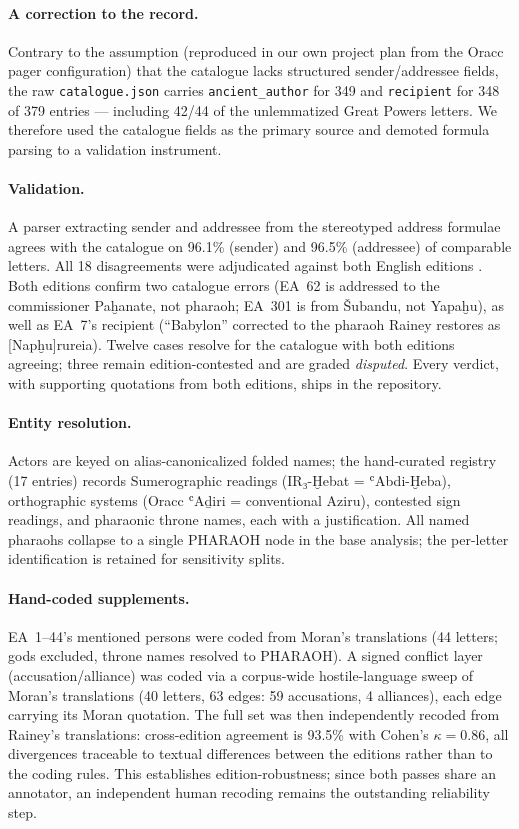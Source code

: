 \documentclass[11pt]{article}
\newcommand{\project}[1]{\texttt{#1}}
\begin{document}
\paragraph{A correction to the record.} Contrary to the assumption
(reproduced in our own project plan from the Oracc pager configuration)
that the catalogue lacks structured sender/addressee fields, the raw
\project{catalogue.json} carries \project{ancient\_author} for 349 and
\project{recipient} for 348 of 379 entries --- including 42/44 of the
unlemmatized Great Powers letters. We therefore used the catalogue fields
as the primary source and demoted formula parsing to a validation
instrument.

\paragraph{Validation.} A parser extracting sender and addressee from
the stereotyped address formulae \citep[cf.][]{Mynarova2007} agrees with
the catalogue on 96.1\% (sender) and 96.5\% (addressee) of comparable
letters. All 18 disagreements were adjudicated against both English
editions \citep{Moran1992, Rainey2015}. Both editions confirm two
catalogue errors (EA~62 is addressed to the commissioner Paḫanate, not
pharaoh; EA~301 is from Šubandu, not Yapaḫu), as well as EA~7's recipient
(``Babylon'' corrected to the pharaoh Rainey restores as
[Napḫu]rureia). Twelve cases resolve for the catalogue with both editions
agreeing; three remain edition-contested and are graded \emph{disputed}.
Every verdict, with supporting quotations from both editions, ships in
the repository.

\paragraph{Entity resolution.} Actors are keyed on alias-canonicalized
folded names; the hand-curated registry (17 entries) records
Sumerographic readings (IR₃-Ḫebat = ʿAbdi-Ḫeba), orthographic systems
(Oracc ʿAḏiri = conventional Aziru), contested sign readings, and
pharaonic throne names, each with a justification.
All named pharaohs collapse to a single PHARAOH node in the base
analysis; the per-letter identification is retained for sensitivity
splits.

\paragraph{Hand-coded supplements.} EA~1--44's mentioned persons were
coded from Moran's translations (44 letters; gods excluded, throne names
resolved to PHARAOH). A signed conflict layer (accusation/alliance) was
coded via a corpus-wide hostile-language sweep of Moran's translations
(40 letters, 63 edges: 59 accusations, 4 alliances), each edge carrying
its Moran quotation. The full set was then independently recoded from
Rainey's translations: cross-edition agreement is 93.5\% with Cohen's
$\kappa=0.86$, all divergences traceable to textual differences between
the editions rather than to the coding rules. This establishes
edition-robustness; since both passes share an annotator, an independent
human recoding remains the outstanding reliability step.
\end{document}
